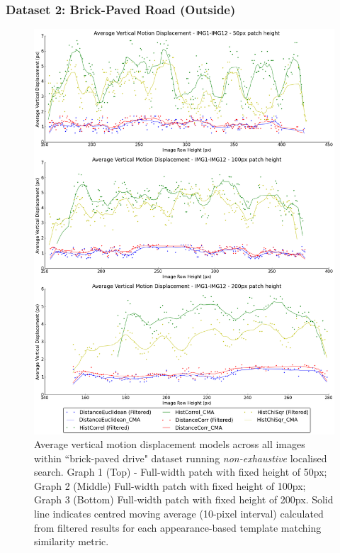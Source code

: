 \clearpage
\subsubsection{Dataset 2: Brick-Paved Road (Outside)}

\begin{figure}[ht!]
\centering
\includegraphics[scale=0.3]{images/results/wiltshire_outside_10cm_non_scaled}
\caption{Average vertical motion displacement models across all images within ``brick-paved drive" dataset running \textit{non-exhaustive} localised search. Graph 1 (Top) - Full-width patch with fixed height of 50px; Graph 2 (Middle) Full-width patch with fixed height of 100px; Graph 3 (Bottom) Full-width patch with fixed height of 200px. Solid line indicates centred moving average (10-pixel interval) calculated from filtered results for each appearance-based template matching similarity metric.}
\label{fig:ex2_2_1}
\end{figure}

